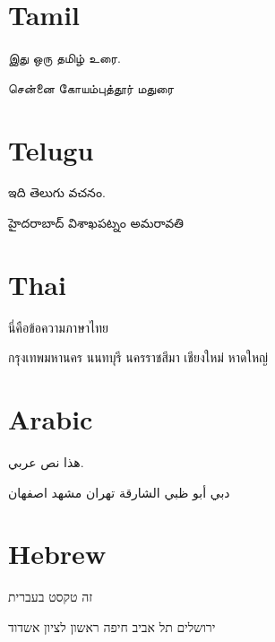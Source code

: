 \documentclass[a4paper]{article}
\begin{document}
\section{Tamil}
\begin{tamil}
இது ஒரு தமிழ் உரை.

சென்னை %
கோயம்புத்தூர் %
மதுரை %
\end{tamil}

\section{Telugu}
\begin{telugu}
ఇది తెలుగు వచనం.

హైదరాబాద్ %
విశాఖపట్నం %
అమరావతి %
\end{telugu}

\section{Thai}
\begin{thai}
นี่คือข้อความภาษาไทย

กรุงเทพมหานคร %
นนทบุรี %
นครราชสีมา %
เชียงใหม่ %
หาดใหญ่ %
\end{thai}

\section{Arabic}
\begin{Arabic}%

هذا نص عربي.

دبي
أبو ظبي
الشارقة
تهران
مشهد
اصفهان

\end{Arabic}

\section{Hebrew}
\begin{hebrew}



זה טקסט בעברית

ירושלים
תל אביב
חיפה
ראשון לציון
אשדוד

\end{hebrew}


\printindex
\end{document}
